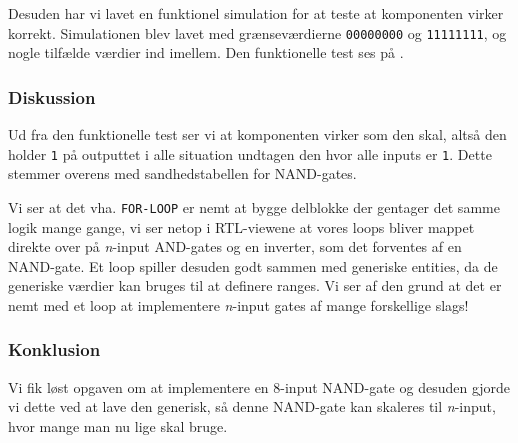 {    Desuden har vi lavet en funktionel simulation for at teste at komponenten virker korrekt. Simulationen blev lavet med grænseværdierne \texttt{00000000} og \texttt{11111111}, og nogle tilfælde værdier ind imellem.
    Den funktionelle test ses på .


    \subsubsection{Diskussion}

    Ud fra den funktionelle test ser vi at komponenten virker som den skal, altså den holder \texttt{1} på outputtet i alle situation undtagen den hvor alle inputs er \texttt{1}. Dette stemmer overens med sandhedstabellen for NAND-gates.

    Vi ser at det vha. \texttt{FOR-LOOP} er nemt at bygge delblokke der gentager det samme logik mange gange, vi ser netop i RTL-viewene at vores loops bliver mappet direkte over på \textit{n}-input AND-gates og en inverter, som det forventes af en NAND-gate.
    Et loop spiller desuden godt sammen med generiske entities, da de generiske værdier kan bruges til at definere ranges.
    Vi ser af den grund at det er nemt med et loop at implementere \textit{n}-input gates af mange forskellige slags!

    \subsubsection{Konklusion}

    Vi fik løst opgaven om at implementere en 8-input NAND-gate og desuden gjorde vi dette ved at lave den generisk, så denne NAND-gate kan skaleres til \textit{n}-input, hvor mange man nu lige skal bruge.
}
